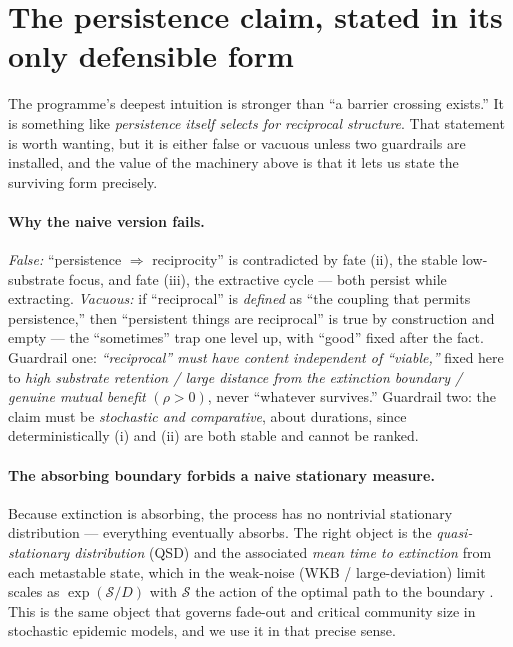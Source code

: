 \documentclass[11pt]{article}
\theoremstyle{plain}
\theoremstyle{definition}
\begin{document}
\section{The persistence claim, stated in its only defensible form}
\label{sec:theorem}

The programme's deepest intuition is stronger than ``a barrier crossing exists.'' It is something like \emph{persistence itself selects for reciprocal structure}. That statement is worth wanting, but it is either false or vacuous unless two guardrails are installed, and the value of the machinery above is that it lets us state the surviving form precisely.

\paragraph{Why the naive version fails.} \emph{False:} ``persistence $\Rightarrow$ reciprocity'' is contradicted by fate (ii), the stable low-substrate focus, and fate (iii), the extractive cycle --- both persist while extracting. \emph{Vacuous:} if ``reciprocal'' is \emph{defined} as ``the coupling that permits persistence,'' then ``persistent things are reciprocal'' is true by construction and empty --- the ``sometimes'' trap one level up, with ``good'' fixed after the fact. Guardrail one: \emph{``reciprocal'' must have content independent of ``viable,''} fixed here to \emph{high substrate retention / large distance from the extinction boundary / genuine mutual benefit} $(\rho > 0)$, never ``whatever survives.'' Guardrail two: the claim must be \emph{stochastic and comparative}, about durations, since deterministically (i) and (ii) are both stable and cannot be ranked.

\paragraph{The absorbing boundary forbids a naive stationary measure.} Because extinction is absorbing, the process has no nontrivial stationary distribution --- everything eventually absorbs. The right object is the \emph{quasi-stationary distribution} (QSD) and the associated \emph{mean time to extinction} from each metastable state, which in the weak-noise (WKB / large-deviation) limit scales as $\exp(\mathcal S/D)$ with $\mathcal S$ the action of the optimal path to the boundary \cite{ovaskainen2010,assaf2017}. This is the same object that governs fade-out and critical community size in stochastic epidemic models, and we use it in that precise sense.
\end{document}
